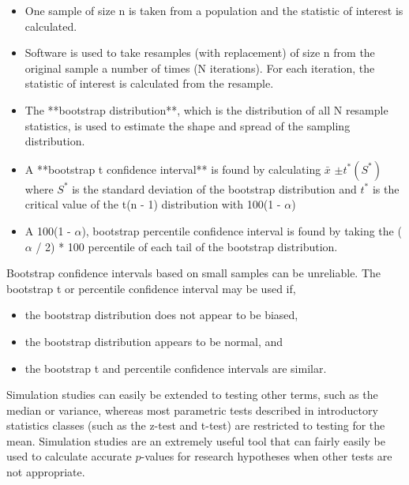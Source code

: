 \documentclass[
]{report}
\begin{document}
\begin{itemize}
\item One sample of size n is taken from a population and the statistic of interest is calculated.
\item Software is used to take resamples (with replacement) of size n from the original sample a number of times (N iterations). For each iteration, the statistic of interest is calculated from the resample.
\item The **bootstrap distribution**, which is the distribution of all N resample statistics, is used to estimate
the shape and spread of the sampling distribution.
\item A **bootstrap t confidence interval** is found by calculating $\scriptstyle \bar{x}$ $\scriptstyle \pm t^*(S^*)$ where $\scriptstyle S^*$ is the standard
deviation of the bootstrap distribution and $\scriptstyle t^*$ is the critical value of the t(n - 1) distribution with 100(1 - $\scriptstyle \alpha$)%
\item A 100(1 - $\scriptstyle \alpha$), bootstrap percentile confidence interval is found by taking the ($\scriptstyle \alpha$ / 2) * 100 percentile of each tail of the bootstrap distribution.
\end{itemize}

Bootstrap confidence intervals based on small samples can be unreliable. The bootstrap t or percentile confidence interval may be used if,
\vspace{-1em}

\begin{itemize}
\item the bootstrap distribution does not appear to be biased,
\item the bootstrap distribution appears to be normal, and
\item the bootstrap t and percentile confidence intervals are similar.
\end{itemize}

Simulation studies can easily be extended to testing other terms, such as the median or variance, whereas most parametric tests described in introductory statistics classes (such as the z-test and t-test) are restricted to testing for the mean. Simulation studies are an extremely useful tool that can fairly easily be used to calculate accurate \(\scriptstyle p\)-values for research hypotheses when other tests are not appropriate.
\end{document}
